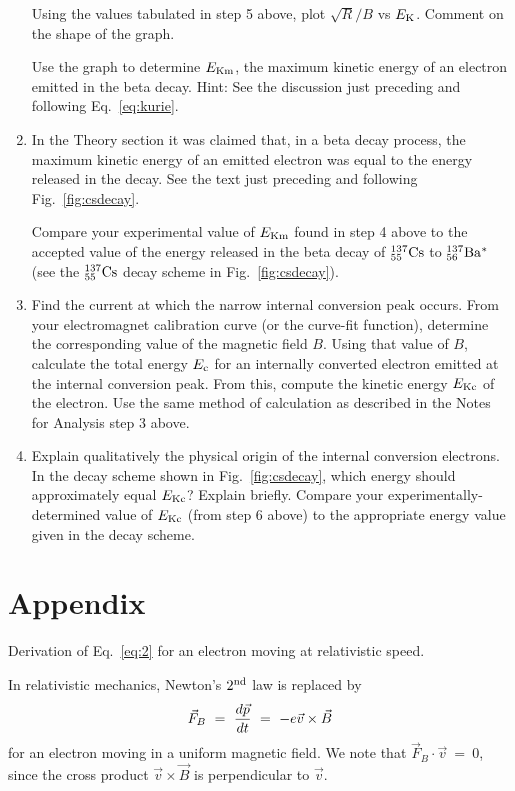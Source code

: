 \documentclass{article}
\newcommand{\cs}{${}^{137}_{55}{\rm Cs}$ }
\newcommand{\bam}{${}^{137}_{56}{\rm Ba^* }$}
\begin{document}
\begin{enumerate}
Using the values tabulated in step 5 above, plot
$\sqrt{R}/B$ vs $E_{\rm K}$.  Comment on the shape of the
graph.

Use the graph to determine $E_{\rm Km}$, the maximum
kinetic energy of an electron emitted in the beta decay.
Hint:  See the discussion just preceding and following Eq.~\ref{eq:kurie}.

\item In the Theory section it was claimed that, in a beta decay
process, the maximum kinetic energy of an emitted electron was equal to
the energy released in the decay.  See the text just preceding and
following Fig.~\ref{fig:csdecay}.

Compare your experimental value of
$E_{\rm Km}$ found in step 4 above to the
accepted value of the energy released in the beta decay of \cs to
\bam (see the \cs decay scheme in Fig.~\ref{fig:csdecay}).

\item Find the current at which the narrow internal conversion
peak occurs.  From your electromagnet calibration curve (or the
curve-fit function), determine the corresponding value of the magnetic
field $B$.  Using that value of $B$, calculate the total energy
$E_{\rm c}$ for an internally converted
electron emitted at the internal conversion peak.  From this, compute
the kinetic energy $E_{\rm Kc}$ of the
electron.  Use the same method of calculation as described in the
Notes for Analysis step 3 above.

\item Explain qualitatively the physical origin of the internal
conversion electrons.  In the decay scheme shown in Fig.~\ref{fig:csdecay}, which
energy should approximately equal $E_{\rm Kc}$?
Explain briefly.  Compare your experimentally-determined value of
$E_{\rm Kc}$ (from step 6 above) to the
appropriate energy value given in the decay scheme.
\end{enumerate}

\section{Appendix}
Derivation of Eq.~\ref{eq:2} for an electron moving at
relativistic speed.

In relativistic mechanics, Newton's
$2^{\rm nd}$ law is replaced by
\begin{equation}
\vec{F}_B ~=~ {d\vec{p} \over dt} ~=~ -e \vec{v} \times \vec{B}
\end{equation}
for an electron
moving  in a uniform magnetic field. We note that $\vec{F}_B \cdot \vec{v} ~=~ 0$,
since the cross product $\vec{v} \times \vec{B}$
is perpendicular to $\vec{v}$.
\end{document}
